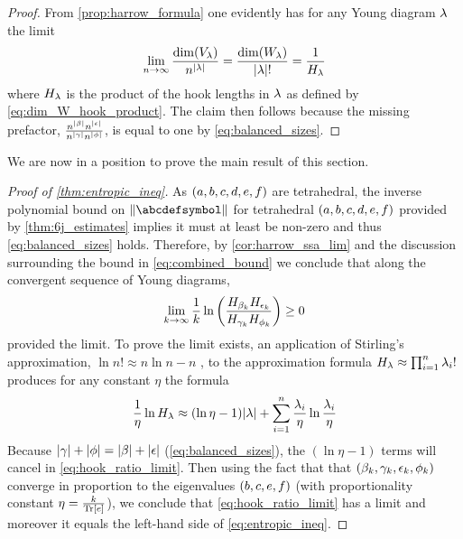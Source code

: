 \documentclass[notitlepage, 11pt, letterpaper]{amsart}
\begin{document}
\begin{proof}
    From \cref{prop:harrow_formula} one evidently has for any Young diagram $\lambda$ the limit
    \begin{equation}
        \lim_{n\to\infty} \frac{\dim(V_{\lambda})}{n^{{|\lambda|}}} = \frac{\dim(W_{\lambda})}{{|\lambda|}!} = \frac{1}{H_{\lambda}}
    \end{equation}
    where $H_{\lambda}$ is the product of the hook lengths in $\lambda$ as defined by \cref{eq:dim_W_hook_product}.
    The claim then follows because the missing prefactor, $\frac{n^{{|\beta|}}n^{{|\epsilon|}}}{n^{{|\gamma|}}n^{{|\phi|}}}$, is equal to one by \cref{eq:balanced_sizes}.
\end{proof}
We are now in a position to prove the main result of this section.
\begin{proof}[Proof of \cref{thm:entropic_ineq}]
    As $(a,b,c,d,e,f)$ are tetrahedral, the inverse polynomial bound on $\norm{\abcdefsymbol}$ for tetrahedral $(a,b,c,d,e,f)$ provided by \cref{thm:6j_estimates} implies it must at least be non-zero and thus \cref{eq:balanced_sizes} holds.
    Therefore, by \cref{cor:harrow_ssa_lim} and the discussion surrounding the bound in \cref{eq:combined_bound} we conclude that along the convergent sequence of Young diagrams,
    \begin{equation}
        \label{eq:hook_ratio_limit}
        \lim_{k\to\infty} \frac{1}{k} \ln \left(\frac{H_{\beta_k}H_{\epsilon_k}}{H_{\gamma_k}H_{\phi_k}}\right) \geq 0
    \end{equation}
    provided the limit.
    To prove the limit exists, an application of Stirling's approximation, $\ln n! \approx n \ln n - n$ \cite{robbins1955remark}, to the approximation formula $H_{\lambda} \approx \prod_{i=1}^{n}\lambda_i!$ produces for any constant $\eta$ the formula
    \begin{equation}
        \frac{1}{\eta}\ln H_{\lambda} \approx (\ln \eta - 1) |\lambda| + \sum_{i=1}^{n} \frac{\lambda_i}{\eta}\ln \frac{\lambda_i}{\eta}
    \end{equation}
    Because ${|\gamma|}+{|\phi|} = {|\beta|}+{|\epsilon|}$ (\cref{eq:balanced_sizes}), the $(\ln \eta - 1)$ terms will cancel in \cref{eq:hook_ratio_limit}.
    Then using the fact that that $(\beta_k, \gamma_k, \epsilon_k, \phi_k)$ converge in proportion to the eigenvalues $(b,c,e,f)$ (with proportionality constant $\eta = \frac{k}{\operatorname{Tr}[e]}$), we conclude that \cref{eq:hook_ratio_limit} has a limit and moreover it equals the left-hand side of \cref{eq:entropic_ineq}.
\end{proof}

\printbibliography
\end{document}
